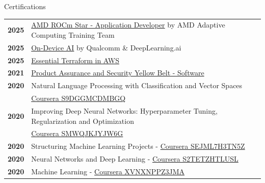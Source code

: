 \documentclass{resume} %
\begin{document}
\begin{rSection}{Certifications}

\begin{tabular}{ @{} >{\bfseries}l @{\hspace{6ex}} l }
2025 & \href{https://learning.amd.com/certs/11279/95A05A0CC78443498F47FD0FDB6188FC65062.pdf}{AMD ROCm Star - Application Developer} by AMD Adaptive Computing Training Team
\\
2025 & \href{https://learn.deeplearning.ai/accomplishments/f4188f58-c075-45f4-b2c8-6b6318c51ceb?usp=sharing}{On-Device AI} by Qualcomm \& DeepLearning.ai
\\
2025 & \href{https://www.linkedin.com/learning/certificates/bfa1f8149f171120da54a209a31361de4ac56fe1e3f167e2cbc8cd9fd7ca38d1?u=2140730}{Essential Terraform in AWS}
\\
2021 & \href{https://www.credly.com/badges/a3861155-a2e2-43d5-a8dd-cc21651c5841?source=linked_in_profile}{Product Assurance and Security Yellow Belt - Software}
\\
2020 & Natural Language Processing with Classification
and Vector Spaces
\\ & \href{https://coursera.org/verify/S9DGGMCDMBGQ}{Coursera S9DGGMCDMBGQ}
\\
2020 & Improving Deep Neural Networks: Hyperparameter
Tuning, Regularization and Optimization
\\ & \href{https://coursera.org/verify/SMWQJKJYJW6G}{Coursera SMWQJKJYJW6G}
\\
2020 & Structuring Machine Learning Projects - \href{https://coursera.org/verify/SEJML7H3TN5Z}{Coursera SEJML7H3TN5Z}
\\
2020 & Neural Networks and Deep Learning - \href{https://coursera.org/verify/S2TETZHTLUSL}{Coursera S2TETZHTLUSL}
\\
2020 & Machine Learning - \href{https://coursera.org/verify/XVNXNPPZ3JMA}{Coursera XVNXNPPZ3JMA}

\end{tabular}

\end{rSection}
\end{document}
